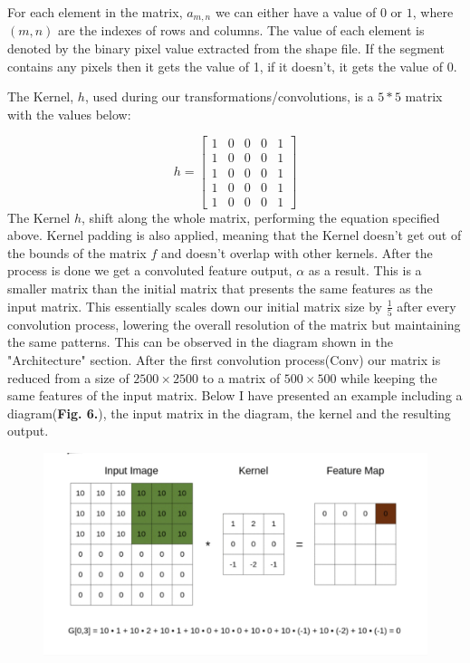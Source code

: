 \documentclass[9pt,onecolumn,oneside]{osajnl}
\begin{document}
	For each element in the matrix, \(a_{m,n} \) we can either have a value of \(0\) or \(1\), where \((m,n)\) are the indexes of rows and columns. The value of each element is denoted by the binary pixel value extracted from the shape file. If the segment contains any pixels then it gets the value of 1, if it doesn't, it gets the value of 0.

	The Kernel, \(h\), used during our transformations/convolutions, is a \(5*5\) matrix with the values below:

\[h =\begin{bmatrix}
1 & 0 & 0 & 0 & 1\\
1 & 0 & 0 & 0 & 1\\
1 & 0 & 0 & 0 & 1\\
1 & 0 & 0 & 0 & 1\\
1 & 0 & 0 & 0 & 1
\end{bmatrix} \]
  The Kernel \(h\), shift along the whole matrix, performing the equation specified above. Kernel padding is also applied, meaning that the Kernel doesn't get out of the bounds of the matrix \(f\) and doesn't overlap with other kernels. After the process is done we get a convoluted feature output, \(
\alpha\) as a result. This is a smaller matrix than the initial matrix that presents the same features as the input matrix. This essentially scales down our initial matrix size by \(\frac{1}{5}\) after every convolution process, lowering the overall resolution of the matrix but maintaining the same patterns. This can be observed in the diagram shown in the "Architecture" section. After the first convolution process(Conv) our matrix is reduced from a size of \(2500 \times 2500 \) to a matrix of \(500 \times 500\) while keeping the same features of the input matrix. Below I have presented an example including a diagram(\textbf{Fig. 6.}), the input matrix in the diagram, the kernel and the resulting output.
    
    \begin{figure}[h]
  \centering
  \begin{minipage}[b]{0.9\textwidth}
    \includegraphics[width=\textwidth]{kerneling.png}
  \end{minipage}
  \\
\end{figure}
\end{document}
